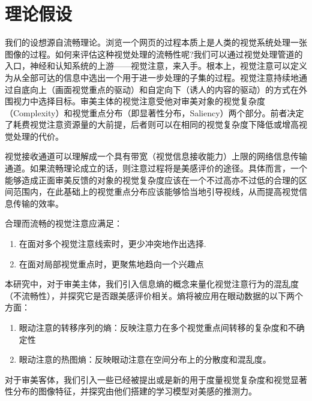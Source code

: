 \chapter{理论假设}
\label{chap:hypothesis}
我们的设想源自流畅理论。浏览一个网页的过程本质上是人类的视觉系统处理一张图像的过程。如何来评估这种视觉处理的流畅性呢?我们可以通过视觉处理管道的入口，神经和认知系统的上游——视觉注意，来入手。根本上，视觉注意可以定义为从全部可达的信息中选出一个用于进一步处理的子集的过程。视觉注意持续地通过自底向上（画面视觉重点的驱动）和自定向下（诱人的内容的驱动）的方式在外围视力中选择目标。审美主体的视觉注意受他对审美对象的视觉复杂度（Complexity）和视觉重点分布（即显著性分布，Saliency）两个部分。前者决定了耗费视觉注意资源量的大前提，后者则可以在相同的视觉复杂度下降低或增高视觉处理的代价。

视觉接收通道可以理解成一个具有带宽（视觉信息接收能力）上限的网络信息传输通道。如果流畅理论成立的话，则注意过程将是美感评价的途径。具体而言，一个能够造成正面审美反馈的对象的视觉复杂度应该在一个不过高亦不过低的合理的区间范围内，在此基础上的视觉重点分布应该能够恰当地引导视线，从而提高视觉信息传输的效率。

合理而流畅的视觉注意应满足：
\begin{enumerate}
  \item 在面对多个视觉注意线索时，更少冲突地作出选择.
  \item 在面对局部视觉重点时，更聚焦地趋向一个兴趣点
\end{enumerate}

本研究中，对于审美主体，我们引入信息熵的概念来量化视觉注意行为的混乱度（不流畅性），并探究它是否跟美感评价相关。熵将被应用在眼动数据的以下两个方面：

\begin{enumerate}
  \item 眼动注意的转移序列的熵：反映注意力在多个视觉重点间转移的复杂度和不确定性
  \item 眼动注意的热图熵：反映眼动注意在空间分布上的分散度和混乱度。
\end{enumerate}

对于审美客体，我们引入一些已经被提出或是新的用于度量视觉复杂度和视觉显著性分布的图像特征，并探究由他们搭建的学习模型对美感的推测力。
